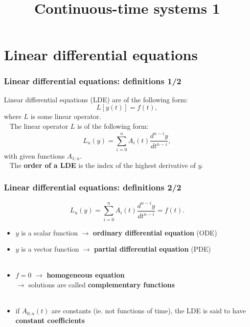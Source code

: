 \documentclass{beamer}
\title{Continuous-time systems 1}
\begin{document}

\begin{frame}
\titlepage
\end{frame}

\begin{frame}
\tableofcontents
\end{frame}

\section{Linear differential equations}

\begin{frame}
\frametitle{Linear differential equations: definitions 1/2}
Linear differential equations (LDE) are of the following form:
\begin{equation*}
L[y(t)] = f(t),
\end{equation*}
where $L$ is some linear operator. \\ \pause
\ \newline
The linear operator $L$ is of the following form:
\begin{equation*}
L_n(y) = \sum_{i=0}^{n} A_i(t) \frac{d^{n-i}y}{dt^{n-i}},
\end{equation*}
with given functions $A_{1:n}$.\\ \pause
\ \newline
The \textbf{order of a LDE} is the index of the highest derivative of $y$.
\end{frame}

\begin{frame}
\frametitle{Linear differential equations: definitions 2/2}
\begin{equation*}
L_n(y) = \sum_{i=0}^{n} A_i(t) \frac{d^{n-i}y}{dt^{n-i}} = f(t).
\end{equation*}
\begin{itemize}
\item $y$ is a scalar function $\rightarrow$ \textbf{ordinary differential equation} (ODE) \pause
\item $y$ is a vector function $\rightarrow$ \textbf{partial differential equation} (PDE) \\
\ \pause
\item $f = 0$ $\rightarrow$ \textbf{homogeneous equation} \\
$\rightarrow$ solutions are called \textbf{complementary functions} \\
\ \pause
\item if $A_{0:n}(t)$ are constants (ie. not functions of time), the LDE is said to have \textbf{constant coefficients}
\end{itemize}
\end{frame}
\end{document}
